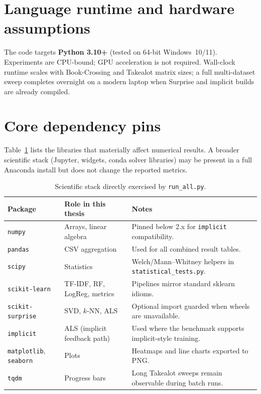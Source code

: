 \section{Language runtime and hardware assumptions}
The code targets \textbf{Python 3.10+} (tested on 64-bit Windows~10/11). Experiments are CPU-bound; GPU acceleration is not required. Wall-clock runtime scales with Book-Crossing and Takealot matrix sizes; a full multi-dataset sweep completes overnight on a modern laptop when Surprise and implicit builds are already compiled.

\section{Core dependency pins}
Table~\ref{tab:app-deps} lists the libraries that materially affect numerical results. A broader scientific stack (Jupyter, widgets, conda solver libraries) may be present in a full Anaconda install but does not change the reported metrics.

\begin{table}[htbp]
  \centering
  \small
  \begin{tabular}{@{}llp{6.8cm}@{}}
    \toprule
    \textbf{Package} & \textbf{Role in this thesis} & \textbf{Notes} \\
    \midrule
    \texttt{numpy} & Arrays, linear algebra & Pinned below 2.x for \texttt{implicit} compatibility. \\
    \texttt{pandas} & CSV aggregation & Used for all combined result tables. \\
    \texttt{scipy} & Statistics & Welch/Mann--Whitney helpers in \texttt{statistical\_tests.py}. \\
    \texttt{scikit-learn} & TF-IDF, RF, LogReg, metrics & Pipelines mirror standard sklearn idioms. \\
    \texttt{scikit-surprise} & SVD, $k$-NN, ALS & Optional import guarded when wheels are unavailable. \\
    \texttt{implicit} & ALS (implicit feedback path) & Used where the benchmark supports implicit-style training. \\
    \texttt{matplotlib}, \texttt{seaborn} & Plots & Heatmaps and line charts exported to PNG. \\
    \texttt{tqdm} & Progress bars & Long Takealot sweeps remain observable during batch runs. \\
    \bottomrule
  \end{tabular}
  \caption{Scientific stack directly exercised by \texttt{run\_all.py}.}
  \label{tab:app-deps}
\end{table}

